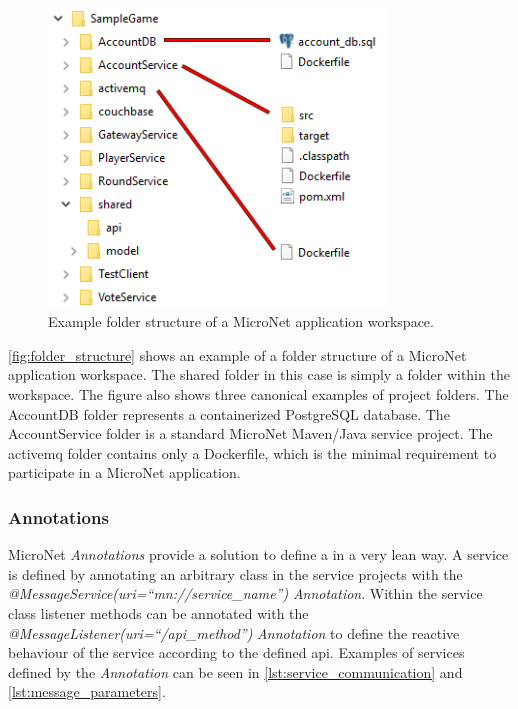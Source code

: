 \begin{figure}
	\centering
	\includegraphics[width=9cm]{images/tools/folder_structure}
	\caption{Example folder structure of a MicroNet application workspace.}
	\label{fig:folder_structure}
\end{figure}

\autoref{fig:folder_structure} shows an example of a folder structure of a
MicroNet application workspace. The shared folder in this case is simply a folder within the
workspace. The figure also shows three canonical examples of project folders.
The AccountDB folder represents a containerized PostgreSQL database. The
AccountService folder is a standard MicroNet Maven/Java service project. The
activemq folder contains only a Dockerfile, which is the minimal requirement to
participate in a MicroNet application.

\subsubsection{Annotations}

MicroNet \textit{Annotations} provide a solution to define a \ms{} in a very
lean way. A service is defined by annotating an arbitrary class in the service
projects with the \textit{@MessageService(uri=``mn://service\_name'')}
\textit{Annotation}. Within the service class listener methods can be annotated
with the \textit{@MessageListener(uri=``/api\_method'')} \textit{Annotation} to
define the reactive behaviour of the service according to the defined \gls{api}.
Examples of services defined by the \textit{Annotation} can be seen in
\autoref{lst:service_communication} and \autoref{lst:message_parameters}.

